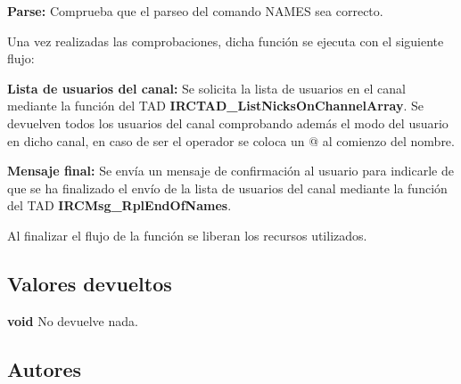 \begin{DoxyItemize}
\item {\bfseries Parse\+:} Comprueba que el parseo del comando N\+A\+M\+ES sea correcto. 
\end{DoxyItemize}

Una vez realizadas las comprobaciones, dicha función se ejecuta con el siguiente flujo\+:


\begin{DoxyItemize}
\item {\bfseries Lista de usuarios del canal\+:} Se solicita la lista de usuarios en el canal mediante la función del T\+AD {\bfseries I\+R\+C\+T\+A\+D\+\_\+\+List\+Nicks\+On\+Channel\+Array}. Se devuelven todos los usuarios del canal comprobando además el modo del usuario en dicho canal, en caso de ser el operador se coloca un @ al comienzo del nombre.  
\item {\bfseries Mensaje final\+:} Se envía un mensaje de confirmación al usuario para indicarle de que se ha finalizado el envío de la lista de usuarios del canal mediante la función del T\+AD {\bfseries I\+R\+C\+Msg\+\_\+\+Rpl\+End\+Of\+Names}.  
\end{DoxyItemize}

Al finalizar el flujo de la función se liberan los recursos utilizados.\hypertarget{server_command_names_return_names}{}\subsection{Valores devueltos}\label{server_command_names_return_names}

\begin{DoxyItemize}
\item {\bfseries void} No devuelve nada. 
\end{DoxyItemize}\hypertarget{server_command_names_authors_names}{}\subsection{Autores}\label{server_command_names_authors_names}

